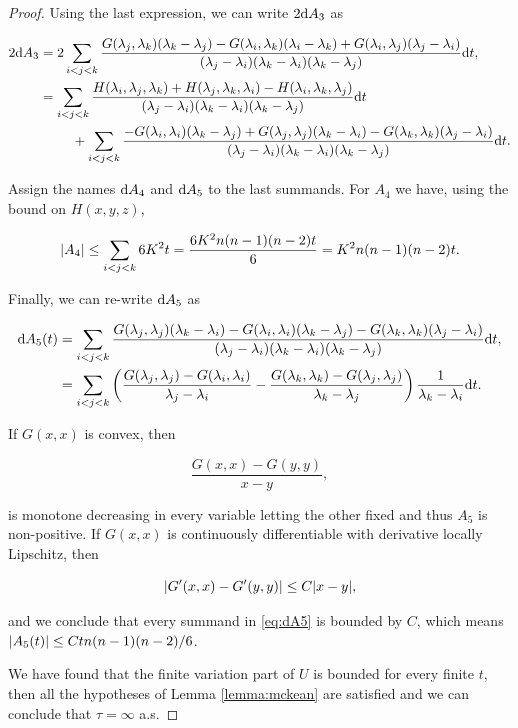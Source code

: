 \begin{proof}
    
    Using the last expression, we can write $2\mathrm d A_3$ as


    \begin{align*}
        2\mathrm d A_3 &= 2\sum_{i<j<k} \frac{G(\lambda_j,\lambda_k)(\lambda_k-\lambda_j) - G(\lambda_i,\lambda_k)(\lambda_i - \lambda_k) + G(\lambda_i,\lambda_j)(\lambda_j - \lambda_i)}{(\lambda_j - \lambda_i)(\lambda_k - \lambda_i)(\lambda_k - \lambda_j)}\mathrm d t,\\
        &= \sum_{i<j<k} \frac{H(\lambda_i,\lambda_j,\lambda_k) + H(\lambda_j,\lambda_k,\lambda_i) - H(\lambda_i,\lambda_k,\lambda_j)}{(\lambda_j - \lambda_i)(\lambda_k - \lambda_i)(\lambda_k - \lambda_j)}\mathrm d t\\
        &\phantom{espac}+ \sum_{i<j<k} \frac{-G(\lambda_i,\lambda_i)(\lambda_k-\lambda_j) + G(\lambda_j,\lambda_j)(\lambda_k - \lambda_i) - G(\lambda_k,\lambda_k)(\lambda_j - \lambda_i)}{(\lambda_j - \lambda_i)(\lambda_k - \lambda_i)(\lambda_k - \lambda_j)}\mathrm d t.
    \end{align*}

    Assign the names $\mathrm d A_4$ and $\mathrm d A_5$ to the last summands. For $A_4$ we have, using the bound on $H(x,y,z)$,

    \begin{align*}
        \lvert A_4 \rvert \le \sum_{i<j<k} 6 K^2t = \frac{6K^2n(n-1)(n-2)t}{6} = K^2n(n-1)(n-2)t.
    \end{align*}

    Finally, we can re-write $\mathrm d A_5$ as 

    \begin{align}
        \mathrm d A_5(t) &= \sum_{i<j<k} \frac{ G(\lambda_j,\lambda_j)(\lambda_k - \lambda_i) - G(\lambda_i,\lambda_i)(\lambda_k - \lambda_j) - G(\lambda_k,\lambda_k)(\lambda_j-\lambda_i)}{(\lambda_j-\lambda_i)(\lambda_k-\lambda_i)(\lambda_k-\lambda_j)}\mathrm d t,\notag \\
        &= \sum_{i<j<k} \left( \frac{G(\lambda_j,\lambda_j) - G(\lambda_i,\lambda_i) }{\lambda_j - \lambda_i} - \frac{G(\lambda_k,\lambda_k) - G(\lambda_j,\lambda_j)}{\lambda_k - \lambda_j} \right)\frac{1}{\lambda_k - \lambda_i}\mathrm d t. \label{eq:dA5}
    \end{align}

    If $G(x,x)$ is convex, then 

    \[ \frac{G(x,x) - G(y,y)}{x-y}, \]

    \noindent is monotone decreasing in every variable letting the other fixed and thus $A_5$ is non-positive. If $G(x,x)$ is continuously differentiable with derivative locally Lipschitz, then 

    \[ \lvert G'(x,x) - G'(y,y) \rvert \le C\lvert x-y \rvert, \]

    \noindent and we conclude that every summand in \eqref{eq:dA5} is bounded by $C$, which means $\lvert A_5(t) \rvert\le Ctn(n-1)(n-2)/6$.

    We have found that the finite variation part of $U$ is bounded for every finite $t$, then all the hypotheses of Lemma \ref{lemma:mckean} are satisfied and we can conclude that $\tau = \infty$ a.s.

\end{proof}

